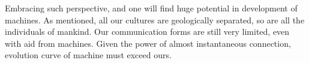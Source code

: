 \documentclass[11pt]{article}
\begin{document}
Embracing such perspective, and one will find huge potential in development of machines. As mentioned, all our cultures are geologically separated, so are all the individuals of mankind. Our communication forms are still very limited, even with aid from machines. Given the power of almost instantaneous connection, evolution curve of machine must exceed ours. 




\end{document}
